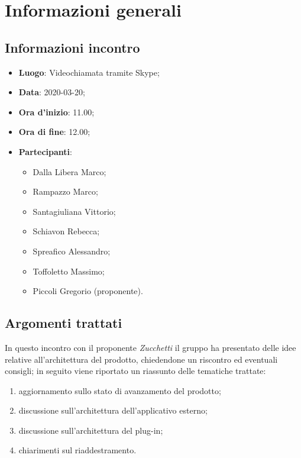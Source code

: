 \section{Informazioni generali}
    \subsection{Informazioni incontro}
        \begin{itemize}
            \item \textbf{Luogo}: Videochiamata tramite Skype;
            \item \textbf{Data}: 2020-03-20;
            \item \textbf{Ora d'inizio}: 11.00;
            \item \textbf{Ora di fine}: 12.00;
            \item \textbf{Partecipanti}: 
            \begin{itemize}
                \item Dalla Libera Marco;
                \item Rampazzo Marco;
                \item Santagiuliana Vittorio;
                \item Schiavon Rebecca;
                \item Spreafico Alessandro;
                \item Toffoletto Massimo;
                \item Piccoli Gregorio (proponente).
            \end{itemize}
        \end{itemize}
    \subsection{Argomenti trattati}
        In questo incontro con il proponente \textit{Zucchetti} il gruppo ha presentato delle idee relative all'architettura del prodotto\glo, chiedendone un riscontro ed eventuali consigli; in seguito viene riportato un riassunto delle tematiche trattate:
        \begin{enumerate}
            \item aggiornamento sullo stato di avanzamento del prodotto\glo;
            \item discussione sull'architettura dell'applicativo esterno;
            \item discussione sull'architettura del plug-in;
            \item chiarimenti sul riaddestramento.
        \end{enumerate}

